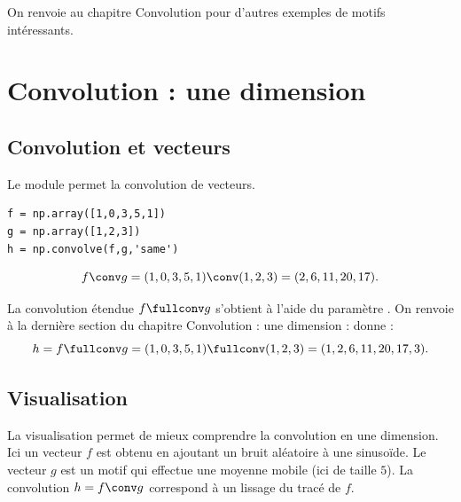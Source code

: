 \documentclass[11pt,class=report,crop=false]{standalone}
\begin{document}
On renvoie au chapitre \og{}Convolution\fg{} pour d'autres exemples de motifs intéressants.


\section{Convolution : une dimension}

\subsection{Convolution et vecteurs}



Le module \numpy{} permet la convolution de vecteurs.

\begin{lstlisting}
f = np.array([1,0,3,5,1])
g = np.array([1,2,3])  
h = np.convolve(f,g,'same')
\end{lstlisting}

$$f \conv g  = (1, 0, 3, 5, 1) \conv  (1, 2, 3) =  (2, 6, 11, 20, 17).$$

La convolution étendue $f \fullconv g$ s'obtient à l'aide du paramètre .
On renvoie à la dernière section du chapitre \og{}Convolution : une dimension\fg{} :
donne :
$$h = f \fullconv g  = (1, 0, 3, 5, 1) \fullconv  (1, 2, 3) =  (1, 2, 6, 11, 20, 17, 3).$$



\subsection{Visualisation}

La visualisation permet de mieux comprendre la convolution en une dimension.
Ici un vecteur $f$ est obtenu en ajoutant un bruit aléatoire à une sinusoïde.
Le vecteur $g$ est un motif qui effectue une moyenne mobile (ici de taille $5$).
La convolution $h = f \conv g$ correspond à un lissage du tracé de $f$.
\end{document}
